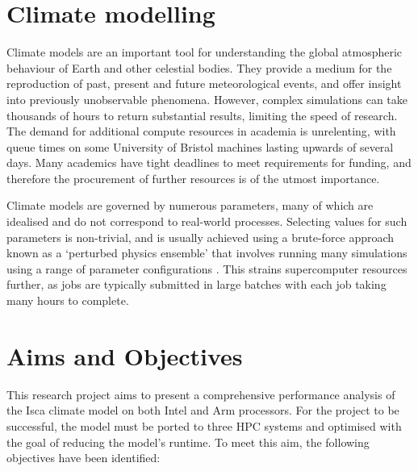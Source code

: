 \documentclass[a4paper,11pt]{report}
\begin{document}
\section{Climate modelling}
Climate models are an important tool for understanding the global atmospheric behaviour of Earth and other celestial bodies. They provide a medium for the reproduction of past, present and future meteorological events, and offer insight into previously unobservable phenomena. However, complex simulations can take thousands of hours to return substantial results, limiting the speed of research. The demand for additional compute resources in academia is unrelenting, with queue times on some University of Bristol machines lasting upwards of several days. Many academics have tight deadlines to meet requirements for funding, and therefore the procurement of further resources is of the utmost importance.%
\par
Climate models are governed by numerous parameters, many of which are idealised and do not correspond to real-world processes. Selecting values for such parameters is non-trivial, and is usually achieved using a brute-force approach known as a ‘perturbed physics ensemble’ that involves running many simulations using a range of parameter configurations \cite{evans2012evaluating}. This strains supercomputer resources further, as jobs are typically submitted in large batches with each job taking many hours to complete.


\section{Aims and Objectives}
This research project aims to present a comprehensive performance analysis of the Isca climate model on both Intel and Arm processors. For the project to be successful, the model must be ported to three HPC systems and optimised with the goal of reducing the model's runtime. To meet this aim, the following objectives have been identified:
\end{document}
